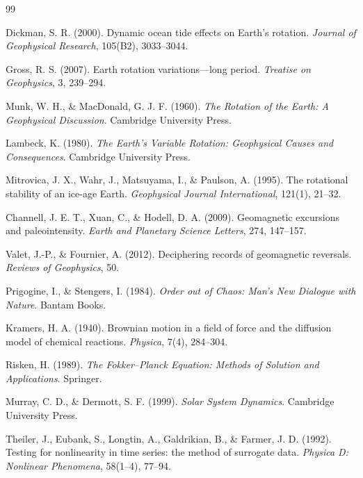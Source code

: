 \documentclass[twocolumn,9pt]{revtex4-2}
\begin{document}
\begin{thebibliography}{99}

Dickman, S. R. (2000).
Dynamic ocean tide effects on Earth's rotation.
\textit{Journal of Geophysical Research}, 105(B2), 3033--3044.

Gross, R. S. (2007).
Earth rotation variations---long period.
\textit{Treatise on Geophysics}, 3, 239--294.

Munk, W. H., \& MacDonald, G. J. F. (1960).
\textit{The Rotation of the Earth: A Geophysical Discussion}.
Cambridge University Press.

Lambeck, K. (1980).
\textit{The Earth's Variable Rotation: Geophysical Causes and Consequences}.
Cambridge University Press.

Mitrovica, J. X., Wahr, J., Matsuyama, I., \& Paulson, A. (1995).
The rotational stability of an ice-age Earth.
\textit{Geophysical Journal International}, 121(1), 21--32.

Channell, J. E. T., Xuan, C., \& Hodell, D. A. (2009).
Geomagnetic excursions and paleointensity.
\textit{Earth and Planetary Science Letters}, 274, 147--157.

Valet, J.-P., \& Fournier, A. (2012).
Deciphering records of geomagnetic reversals.
\textit{Reviews of Geophysics}, 50.

Prigogine, I., \& Stengers, I. (1984).
\textit{Order out of Chaos: Man's New Dialogue with Nature}.
Bantam Books.

Kramers, H. A. (1940).
Brownian motion in a field of force and the diffusion model of chemical reactions.
\textit{Physica}, 7(4), 284--304.

Risken, H. (1989).
\textit{The Fokker--Planck Equation: Methods of Solution and Applications}.
Springer.

Murray, C. D., \& Dermott, S. F. (1999).
\textit{Solar System Dynamics}.
Cambridge University Press.

Theiler, J., Eubank, S., Longtin, A., Galdrikian, B., \& Farmer, J. D. (1992).
Testing for nonlinearity in time series: the method of surrogate data.
\textit{Physica D: Nonlinear Phenomena}, 58(1--4), 77--94.


\end{thebibliography}
\end{document}
